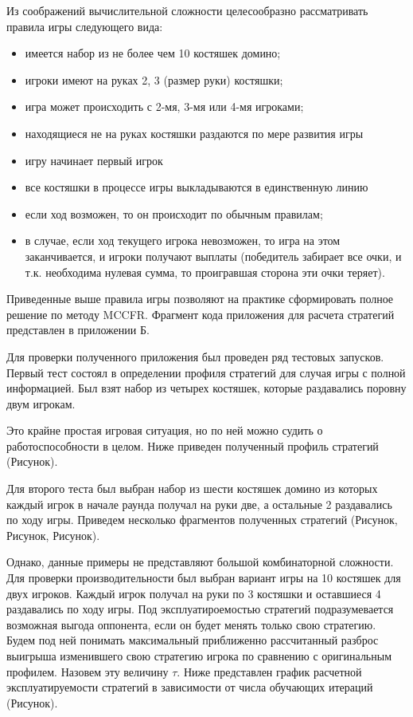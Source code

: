 Из соображений вычислительной сложности целесообразно рассматривать правила игры следующего вида:
\begin{itemize}	
\item имеется набор из не более чем 10 костяшек домино;
\item игроки имеют на руках 2, 3 (размер руки) костяшки;
\item игра может происходить с 2-мя, 3-мя или 4-мя игроками;
\item находящиеся не на руках костяшки раздаются по мере развития игры
\item игру начинает первый игрок
\item все костяшки в процессе игры выкладываются в единственную линию
\item если ход возможен, то он происходит по обычным правилам;
\item в случае, если ход текущего игрока невозможен, то игра на этом заканчивается, и игроки получают выплаты (победитель забирает все очки, и т.к. необходима нулевая сумма, то проигравшая сторона эти очки теряет).
\end{itemize}
\par
Приведенные выше правила игры позволяют на практике сформировать полное решение по методу MCCFR. Фрагмент кода приложения для расчета стратегий представлен в приложении Б.
\par
Для проверки полученного приложения был проведен ряд тестовых запусков. Первый тест состоял в определении профиля стратегий для случая игры с полной информацией. Был взят набор из четырех костяшек, которые раздавались поровну двум игрокам. 
\par
Это крайне простая игровая ситуация, но по ней можно судить о работоспособности в целом. Ниже приведен полученный профиль стратегий (Рисунок). 
\par
Для второго теста был выбран набор из шести костяшек домино из которых каждый игрок в начале раунда получал на руки две, а остальные 2 раздавались по ходу игры. Приведем несколько фрагментов полученных стратегий (Рисунок, Рисунок, Рисунок).
\par
Однако, данные примеры не представляют большой комбинаторной сложности. Для проверки производительности был выбран вариант игры на 10 костяшек для двух игроков. Каждый игрок получал на руки по 3 костяшки и оставшиеся 4 раздавались по ходу игры. Под эксплуатироемостью стратегий подразумевается возможная выгода оппонента, если он будет менять только свою стратегию. Будем под ней понимать максимальный приближенно рассчитанный разброс выигрыша изменившего свою стратегию игрока по сравнению с оригинальным профилем. Назовем эту величину $\tau$. Ниже представлен график расчетной эксплуатируемости стратегий в зависимости от числа обучающих итераций (Рисунок).